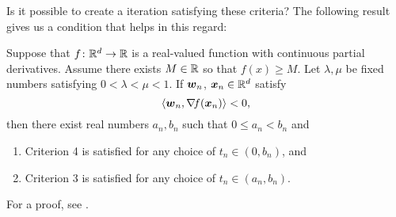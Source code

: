 \separator

Is it possible to create a iteration satisfying these criteria?  The following result gives us a condition that helps in this regard:

\begin{theorem}[Wolfe]\label{theorem:Wolfe}
Suppose that $f \colon \mathbb{R}^d \to \mathbb{R}$ is a real-valued function with continuous partial derivatives.  Assume there exists $M \in \mathbb{R}$ so that $f(x) \geq M$.  Let $\lambda, \mu$ be fixed numbers satisfying $0 < \lambda < \mu < 1$.  If $\boldsymbol{w}_n$, $\boldsymbol{x}_n \in \mathbb{R}^d$ satisfy 
\begin{equation*}
\langle \boldsymbol{w}_n, \mathop{\nabla\! {f}}(\boldsymbol{x}_n) \rangle < 0,
\end{equation*}  
then there exist real numbers $a_n, b_n$ such that $0 \leq a_n < b_n$ and
\begin{enumerate}
	\item Criterion 4 is satisfied for any choice of $t_n \in (0, b_n)$, and
	\item Criterion 3 is satisfied for any choice of $t_n \in (a_n, b_n)$.
\end{enumerate}
\end{theorem}

\begin{remark}
For a proof, see \cite[Theorem 3.3.1]{peressini1988mathematics}.
\end{remark}


